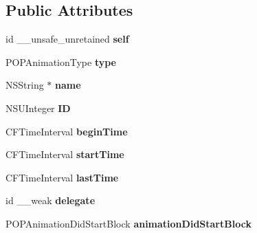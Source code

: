 \subsection*{Public Attributes}
\begin{DoxyCompactItemize}
\item 
\mbox{\label{struct___p_o_p_animation_state_a9a2e464bbcf95538b014ce28c23e7ca1}} 
id \+\_\+\+\_\+unsafe\+\_\+unretained {\bfseries self}
\item 
\mbox{\label{struct___p_o_p_animation_state_ad48a76b9a08ac862e8e6eace2ae96ccb}} 
P\+O\+P\+Animation\+Type {\bfseries type}
\item 
\mbox{\label{struct___p_o_p_animation_state_a6fc01820cb777094a90ddc86c62b621e}} 
N\+S\+String $\ast$ {\bfseries name}
\item 
\mbox{\label{struct___p_o_p_animation_state_a2387b9aaef2b377be91f85bc2c609b3f}} 
N\+S\+U\+Integer {\bfseries ID}
\item 
\mbox{\label{struct___p_o_p_animation_state_a59c122c578e7fd29cbca9c4586d6cfdb}} 
C\+F\+Time\+Interval {\bfseries begin\+Time}
\item 
\mbox{\label{struct___p_o_p_animation_state_a0891e00e8bae7490c65c34be4e64c4e1}} 
C\+F\+Time\+Interval {\bfseries start\+Time}
\item 
\mbox{\label{struct___p_o_p_animation_state_ae8578b0e100ee376ed61e8356a7e6139}} 
C\+F\+Time\+Interval {\bfseries last\+Time}
\item 
\mbox{\label{struct___p_o_p_animation_state_a002915d19eaec23ed332f4c138f0a932}} 
id \+\_\+\+\_\+weak {\bfseries delegate}
\item 
\mbox{\label{struct___p_o_p_animation_state_a9bd1a619764d1e415eb9feb06d072fab}} 
P\+O\+P\+Animation\+Did\+Start\+Block {\bfseries animation\+Did\+Start\+Block}
\item 
\mbox{\label{struct___p_o_p_animation_state_ad1f6abf1be9a29e9791a33b9b23205c8}} 

\end{DoxyCompactItemize}
